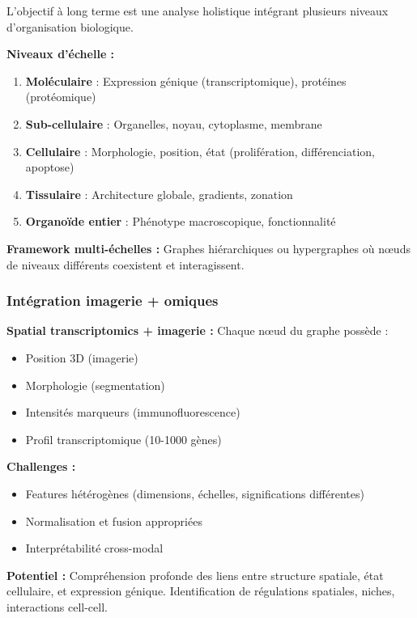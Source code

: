 L'objectif à long terme est une analyse holistique intégrant plusieurs niveaux d'organisation biologique.

\textbf{Niveaux d'échelle :}
\begin{enumerate}
    \item \textbf{Moléculaire} : Expression génique (transcriptomique), protéines (protéomique)
    \item \textbf{Sub-cellulaire} : Organelles, noyau, cytoplasme, membrane
    \item \textbf{Cellulaire} : Morphologie, position, état (prolifération, différenciation, apoptose)
    \item \textbf{Tissulaire} : Architecture globale, gradients, zonation
    \item \textbf{Organoïde entier} : Phénotype macroscopique, fonctionnalité
\end{enumerate}

\textbf{Framework multi-échelles :}
Graphes hiérarchiques ou hypergraphes où nœuds de niveaux différents coexistent et interagissent.

\subsubsection{Intégration imagerie + omiques}

\textbf{Spatial transcriptomics + imagerie :}
Chaque nœud du graphe possède :
\begin{itemize}
    \item Position 3D (imagerie)
    \item Morphologie (segmentation)
    \item Intensités marqueurs (immunofluorescence)
    \item Profil transcriptomique (10-1000 gènes)
\end{itemize}

\textbf{Challenges :}
\begin{itemize}
    \item Features hétérogènes (dimensions, échelles, significations différentes)
    \item Normalisation et fusion appropriées
    \item Interprétabilité cross-modal
\end{itemize}

\textbf{Potentiel :}
Compréhension profonde des liens entre structure spatiale, état cellulaire, et expression génique. Identification de régulations spatiales, niches, interactions cell-cell.

